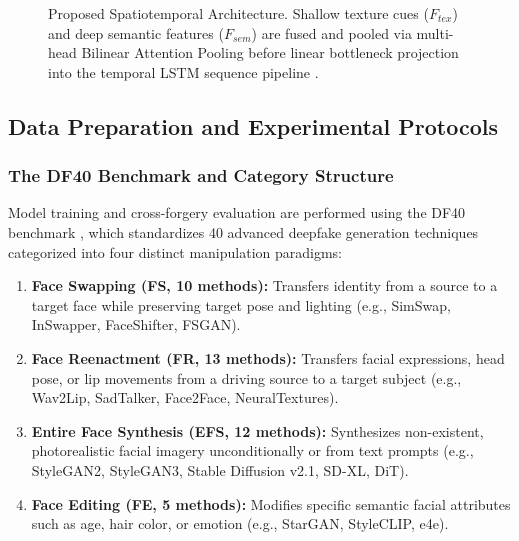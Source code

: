 \begin{figure}[ht]
{}
    \caption{Proposed Spatiotemporal Architecture. Shallow texture cues ($F_{tex}$) and deep semantic features ($F_{sem}$) are fused and pooled via multi-head Bilinear Attention Pooling before linear bottleneck projection into the temporal LSTM sequence pipeline \citep{Zhao2021MultiAttentional, Jugade2026SpatialTemporal}.}
    \label{fig:architecture}
\end{figure}

\subsection{Data Preparation and Experimental Protocols}

\subsubsection{The DF40 Benchmark and Category Structure}
Model training and cross-forgery evaluation are performed using the DF40 benchmark \citep{Yan2024DF40}, which standardizes 40 advanced deepfake generation techniques categorized into four distinct manipulation paradigms:
\begin{enumerate}
    \item \textbf{Face Swapping (FS, 10 methods):} Transfers identity from a source to a target face while preserving target pose and lighting (e.g., SimSwap, InSwapper, FaceShifter, FSGAN).
    \item \textbf{Face Reenactment (FR, 13 methods):} Transfers facial expressions, head pose, or lip movements from a driving source to a target subject (e.g., Wav2Lip, SadTalker, Face2Face, NeuralTextures).
    \item \textbf{Entire Face Synthesis (EFS, 12 methods):} Synthesizes non-existent, photorealistic facial imagery unconditionally or from text prompts (e.g., StyleGAN2, StyleGAN3, Stable Diffusion v2.1, SD-XL, DiT).
    \item \textbf{Face Editing (FE, 5 methods):} Modifies specific semantic facial attributes such as age, hair color, or emotion (e.g., StarGAN, StyleCLIP, e4e).
\end{enumerate}

